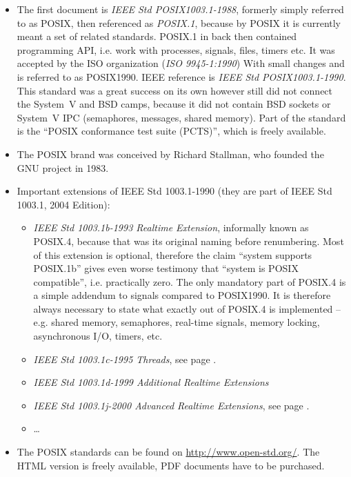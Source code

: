 \begin{itemize}
\item The first document is \emph{IEEE Std POSIX1003.1-1988}, formerly simply
referred to as POSIX, then referenced as \emph{POSIX.1}, because by POSIX it is
currently meant a set of related standards. POSIX.1 in back then contained
programming API, i.e. work with processes, signals, files, timers etc.
It was accepted by the ISO organization (\emph{ISO 9945-1:1990}) With small
changes and is referred to as POSIX1990. IEEE reference is
\emph{IEEE Std POSIX1003.1-1990}. This standard was a great success on its own
however still did not connect the System~V and BSD camps, because it did not
contain BSD sockets or System~V IPC (semaphores, messages, shared memory).
Part of the standard is the ``POSIX conformance test suite (PCTS)'', which is
freely available.
\item The POSIX brand was conceived by Richard Stallman, who founded the GNU
project in 1983.
\item Important extensions of IEEE Std 1003.1-1990 (they are part of IEEE Std
1003.1, 2004 Edition):
\begin{itemize}
\item \emph{IEEE Std 1003.1b-1993 Realtime Extension}, informally known as
POSIX.4, because that was its original naming before renumbering.
Most of this extension is optional, therefore the claim ``system supports
POSIX.1b'' gives even worse testimony that ``system is POSIX compatible'', i.e.
practically zero. The only mandatory part of POSIX.4 is a simple addendum to
signals compared to POSIX1990. It is therefore always necessary to state
what exactly out of POSIX.4 is implemented -- e.g. shared memory, semaphores,
real-time signals, memory locking, asynchronous I/O, timers, etc.
\item \emph{IEEE Std 1003.1c-1995 Threads}, see page \pageref{POSIXTHREADS}.
\item \emph{IEEE Std 1003.1d-1999 Additional Realtime Extensions}
\item \emph{IEEE Std 1003.1j-2000 Advanced Realtime Extensions}, see page
\pageref{RWLOCKS}.
\item \dots
\end{itemize}
\item The POSIX standards can be found on \url{http://www.open-std.org/}.
The HTML version is freely available, PDF documents have to be purchased.
\end{itemize}




